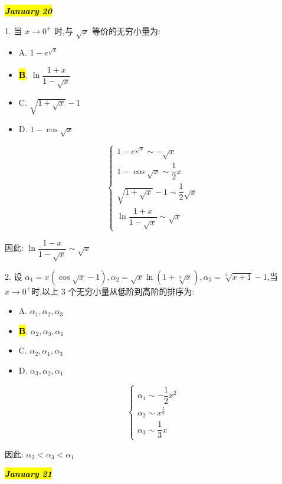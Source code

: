 \hl{\textbf{\textit{January 20}}}

1. 当 $x\to 0^{+}$ 时,与 $\sqrt{x}$ 等价的无穷小量为:
\begin{itemize}
	\item A. $1-e^{\sqrt{x}}$
	\item \hl{\textbf{B}}. $\ln\dfrac{1+x}{1-\sqrt{x}}$
	\item C. $\sqrt{1+\sqrt{x}}-1$
	\item D. $1-\cos \sqrt{x}$
\end{itemize}
\begin{solution}

	$$\begin{cases} 
		1-e^{\sqrt{x}}\sim -\sqrt{x}\\
		1-\cos\sqrt{x} \sim \dfrac{1}{2}x\\
		\sqrt{1+\sqrt{x}}-1 \sim \dfrac{1}{2}\sqrt{x}\\
		\ln\dfrac{1+x}{1-\sqrt{x}}\sim \sqrt{x}
	\end{cases}$$

	因此: $\ln \dfrac{1-x}{1-\sqrt{x}}\sim \sqrt{x}$
\end{solution}

2. 设 $\alpha_{1}=x(\cos\sqrt{x}-1),\alpha_{2}=\sqrt{x}\ln(1+\sqrt[3]{x}),\alpha_{3}=\sqrt[3]{x+1}-1$,当 $x\to 0^{+}$时,以上 $3$ 个无穷小量从低阶到高阶的排序为:
\begin{itemize}
	\item A. $\alpha_{1},\alpha_{2},\alpha_{3}$
	\item \hl{\textbf{B}}. $\alpha_{2},\alpha_{3},\alpha_{1}$
	\item C. $\alpha_{2},\alpha_{1},\alpha_{3}$
	\item D. $\alpha_{3},\alpha_{2},\alpha_{1}$
\end{itemize}
\begin{solution}

	$$\begin{cases}
		\alpha_{1}\sim -\dfrac{1}{2}x^{2}\\
		\alpha_{2}\sim x^{\frac{5}{6}}\\
		\alpha_{3}\sim \dfrac{1}{3}x
	\end{cases}$$

	因此: $\alpha_{2} < \alpha_{3} < \alpha_{1}$
\end{solution}

\hl{\textbf{\textit{January 21}}}

